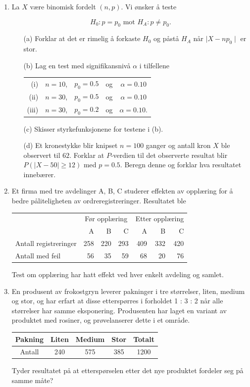 \begin{enumerate}
\item  La $X$ være binomisk fordelt $(n,p)$. Vi ønsker å teste

\[ H_0 : p=p_0 \mbox{\ \  mot \ \ } H_A : p \neq p_0 . \]
\begin{itemize}
\item[(a)] Forklar at det er rimelig å forkaste $H_0$ og
   påstå $H_A$ når $\mid X - np_0\mid$ er stor.
\item[(b)]Lag en test med signifikansnivå $\alpha$ i tilfellene
  \begin{center}
  \begin{tabular}{rcccc}
 (i) & $n=10$, & $p_0=0.5$ & og & $\alpha =0.10$ \\
 (ii)& $n=30$, & $p_0=0.5$ & og & $\alpha =0.10$ \\
(iii)& $n=30$, & $p_0=0.2$ & og & $\alpha =0.10$.
  \end{tabular}
  \end{center}
\item[(c)] Skisser styrkefunksjonene for testene i (b).
\item[(d)] Et kronestykke blir knipset $n=100$ ganger og antall
  kron $X$ ble observert til $62$. Forklar at $P$-verdien
  til det observerte resultat blir $P(\mid X - 50\mid
  \geq 12)$ med $p=0.5$. Beregn denne og forklar hva
  resultatet innebærer.
\end{itemize}

\item Et firma med tre avdelinger A, B, C studerer effekten av opplæring
for å bedre påliteligheten av ordreregistreringer. Resultatet ble
\begin{center}
\begin{tabular}{l|rrr|rrr}
  &\multicolumn{3}{c|}{Før opplæring}
  &\multicolumn{3}{c}{Etter opplæring}\\ \cline{2-7}
                     &  A  &  B  &  C  &  A  &  B  &  C  \\  \hline
Antall registreringer& 258 & 220 & 293 & 409 & 332 & 420  \\
Antall med feil      &  56 &  35 &  59 &  68 &  20 &  76  \\  \hline
\end{tabular}
\end{center}
Test om opplæring har hatt effekt ved hver enkelt avdeling og samlet. 

\item En produsent av frokostgryn leverer pakninger i tre størrelser,
liten, medium og stor, og har erfart at disse etterspørres i 
forholdet 1 : 3 : 2 når alle størrelser har samme eksponering.
Produsenten har laget en variant av produktet med rosiner, og
prøvelanserer dette i et område.
\begin{center}
\begin{tabular}{c|ccc|c}
Pakning   &   Liten &  Medium &  Stor   &    Totalt \\ \hline
Antall    &    240  &    575  &   385   &     1200 \\ \hline
\end{tabular}
\end{center}
Tyder resultatet på at etterspørselen etter det nye produktet
fordeler seg på samme måte?


\end{enumerate}
